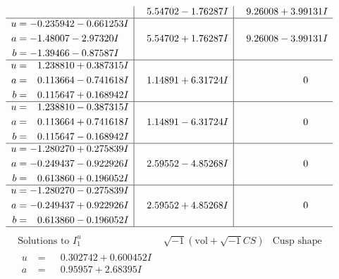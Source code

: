 \documentclass[1p]{elsarticle_modified}
\theoremstyle{definition}
\newcommand{\I}{\sqrt{-1}}
\begin{document}
$$\begin{array}{c|c|c}
 & \phantom{-}5.54702 - 1.76287 I & \phantom{-}9.26008 + 3.99131 I \\ \hline\begin{aligned}
u &= -0.235942 - 0.661253 I \\
a &= -1.48007 - 2.97320 I \\
b &= -1.39466 - 0.87587 I\end{aligned}
 & \phantom{-}5.54702 + 1.76287 I & \phantom{-}9.26008 - 3.99131 I \\ \hline\begin{aligned}
u &= \phantom{-}1.238810 + 0.387315 I \\
a &= \phantom{-}0.113664 - 0.741618 I \\
b &= \phantom{-}0.115647 + 0.168942 I\end{aligned}
 & \phantom{-}1.14891 + 6.31724 I & \phantom{-0.000000 } 0 \\ \hline\begin{aligned}
u &= \phantom{-}1.238810 - 0.387315 I \\
a &= \phantom{-}0.113664 + 0.741618 I \\
b &= \phantom{-}0.115647 - 0.168942 I\end{aligned}
 & \phantom{-}1.14891 - 6.31724 I & \phantom{-0.000000 } 0 \\ \hline\begin{aligned}
u &= -1.280270 + 0.275839 I \\
a &= -0.249437 - 0.922926 I \\
b &= \phantom{-}0.613860 + 0.196052 I\end{aligned}
 & \phantom{-}2.59552 - 4.85268 I & \phantom{-0.000000 } 0 \\ \hline\begin{aligned}
u &= -1.280270 - 0.275839 I \\
a &= -0.249437 + 0.922926 I \\
b &= \phantom{-}0.613860 - 0.196052 I\end{aligned}
 & \phantom{-}2.59552 + 4.85268 I & \phantom{-0.000000 } 0\\
 \hline 
 \end{array}$$\newpage$$\begin{array}{c|c|c}  
\text{Solutions to }I^u_{1}& \I (\text{vol} + \sqrt{-1}CS) & \text{Cusp shape}\\
 \hline 
\begin{aligned}
u &= \phantom{-}0.302742 + 0.600452 I \\
a &= \phantom{-}0.95957 + 2.68395 I \\

\end{aligned}
\end{array}$$
\end{document}
